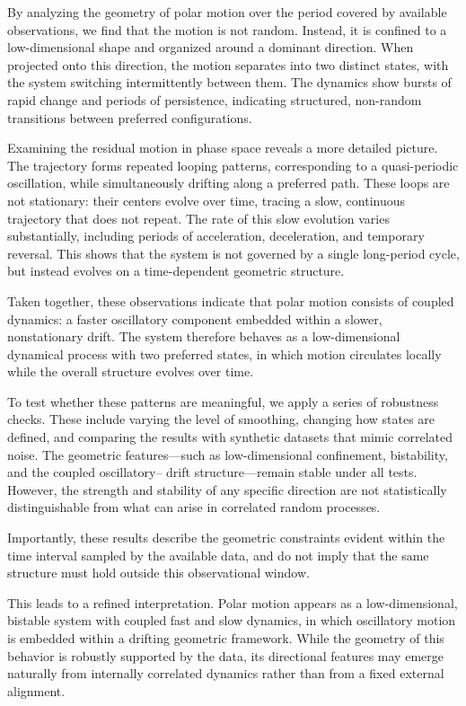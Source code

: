 \documentclass[twocolumn,9pt]{revtex4-2}
\begin{document}
By analyzing the geometry of polar motion over the period covered by available observations,
we find that the motion is not random. Instead, it is confined to a low-dimensional shape
and organized around a dominant direction. When projected onto this direction, the motion
separates into two distinct states, with the system switching intermittently between them.
The dynamics show bursts of rapid change and periods of persistence, indicating structured,
non-random transitions between preferred configurations.

Examining the residual motion in phase space reveals a more detailed picture. The trajectory
forms repeated looping patterns, corresponding to a quasi-periodic oscillation, while
simultaneously drifting along a preferred path. These loops are not stationary: their
centers evolve over time, tracing a slow, continuous trajectory that does not repeat.
The rate of this slow evolution varies substantially, including periods of acceleration,
deceleration, and temporary reversal. This shows that the system is not governed by a
single long-period cycle, but instead evolves on a time-dependent geometric structure.

Taken together, these observations indicate that polar motion consists of coupled dynamics:
a faster oscillatory component embedded within a slower, nonstationary drift. The system
therefore behaves as a low-dimensional dynamical process with two preferred states, in
which motion circulates locally while the overall structure evolves over time.

To test whether these patterns are meaningful, we apply a series of robustness checks.
These include varying the level of smoothing, changing how states are defined, and
comparing the results with synthetic datasets that mimic correlated noise. The geometric
features—such as low-dimensional confinement, bistability, and the coupled oscillatory–
drift structure—remain stable under all tests. However, the strength and stability of any
specific direction are not statistically distinguishable from what can arise in correlated
random processes.

Importantly, these results describe the geometric constraints evident within the time
interval sampled by the available data, and do not imply that the same structure must
hold outside this observational window.

This leads to a refined interpretation. Polar motion appears as a low-dimensional, bistable system with coupled fast and slow dynamics, in which oscillatory motion is embedded within a drifting geometric framework. While the geometry of this behavior is robustly supported by the data, its directional features may emerge naturally from internally correlated dynamics rather than from a fixed external alignment.
\end{document}
